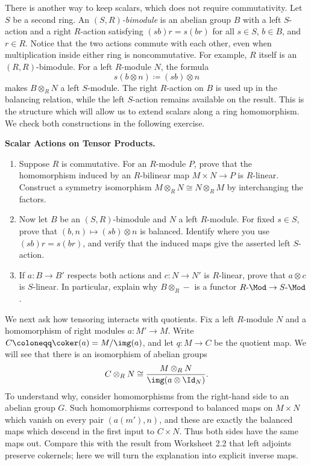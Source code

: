 \documentclass[12pt,reqno]{amsart}
\begin{document}
There is another way to keep scalars, which does not require commutativity. Let $S$ be a second ring. An \emph{$(S,R)$-bimodule} is an abelian group $B$ with a left $S$-action and a right $R$-action satisfying $(sb)r=s(br)$ for all $s\in S$, $b\in B$, and $r\in R$. Notice that the two actions commute with each other, even when multiplication inside either ring is noncommutative. For example, $R$ itself is an $(R,R)$-bimodule. For a left $R$-module $N$, the formula
\[
s(b\otimes n)\coloneqq(sb)\otimes n
\]
makes $B\otimes_RN$ a left $S$-module. The right $R$-action on $B$ is used up in the balancing relation, while the left $S$-action remains available on the result. This is the structure which will allow us to extend scalars along a ring homomorphism. We check both constructions in the following exercise.

\hrulefill

\begin{problems}
\item\label{t:actions} \textbf{Scalar Actions on Tensor Products.}
\begin{enumerate}
\item Suppose $R$ is commutative. For an $R$-module $P$, prove that the homomorphism induced by an $R$-bilinear map $M\times N\to P$ is $R$-linear. Construct a symmetry isomorphism $M\otimes_RN\cong N\otimes_RM$ by interchanging the factors.
\item Now let $B$ be an $(S,R)$-bimodule and $N$ a left $R$-module. For fixed $s\in S$, prove that $(b,n)\mapsto(sb)\otimes n$ is balanced. Identify where you use $(sb)r=s(br)$, and verify that the induced maps give the asserted left $S$-action.
\item If $a:B\to B'$ respects both actions and $c:N\to N'$ is $R$-linear, prove that $a\otimes c$ is $S$-linear. In particular, explain why $B\otimes_R-$ is a functor $R\text{-}\Mod\to S\text{-}\Mod$.
\end{enumerate}
\end{problems}

\hrulefill

We next ask how tensoring interacts with quotients. Fix a left $R$-module $N$ and a homomorphism of right modules $a:M'\to M$. Write $C\coloneqq\coker(a)=M/\img(a)$, and let $q:M\to C$ be the quotient map. We will see that there is an isomorphism of abelian groups
\[
C\otimes_RN\cong\frac{M\otimes_RN}{\img(a\otimes\Id_N)}.
\]
To understand why, consider homomorphisms from the right-hand side to an abelian group $G$. Such homomorphisms correspond to balanced maps on $M\times N$ which vanish on every pair $(a(m'),n)$, and these are exactly the balanced maps which descend in the first input to $C\times N$. Thus both sides have the same maps out. Compare this with the result from Worksheet 2.2 that left adjoints preserve cokernels; here we will turn the explanation into explicit inverse maps.
\end{document}
